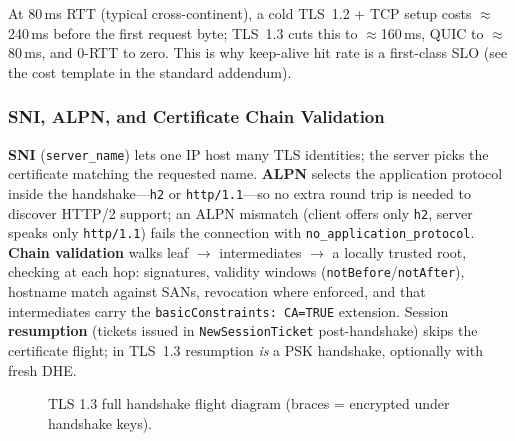 At 80\,ms RTT (typical cross-continent), a cold TLS~1.2 + TCP setup costs $\approx$240\,ms before the first request byte; TLS~1.3 cuts this to $\approx$160\,ms, QUIC to $\approx$80\,ms, and 0-RTT to zero. This is why keep-alive hit rate is a first-class SLO (see the cost template in the standard addendum).

\subsubsection{SNI, ALPN, and Certificate Chain Validation}

\textbf{SNI} (\texttt{server\_name}) lets one IP host many TLS identities; the server picks the certificate matching the requested name. \textbf{ALPN} selects the application protocol inside the handshake---\texttt{h2} or \texttt{http/1.1}---so no extra round trip is needed to discover HTTP/2 support; an ALPN mismatch (client offers only \texttt{h2}, server speaks only \texttt{http/1.1}) fails the connection with \texttt{no\_application\_protocol}. \textbf{Chain validation} walks leaf $\rightarrow$ intermediates $\rightarrow$ a locally trusted root, checking at each hop: signatures, validity windows (\texttt{notBefore}/\texttt{notAfter}), hostname match against SANs, revocation where enforced, and that intermediates carry the \texttt{basicConstraints: CA=TRUE} extension. Session \textbf{resumption} (tickets issued in \texttt{NewSessionTicket} post-handshake) skips the certificate flight; in TLS~1.3 resumption \emph{is} a PSK handshake, optionally with fresh DHE.

\begin{figure}[h]
  \centering
  \caption{TLS 1.3 full handshake flight diagram (braces = encrypted under handshake keys).}
  \label{fig:tls13}
\end{figure}

